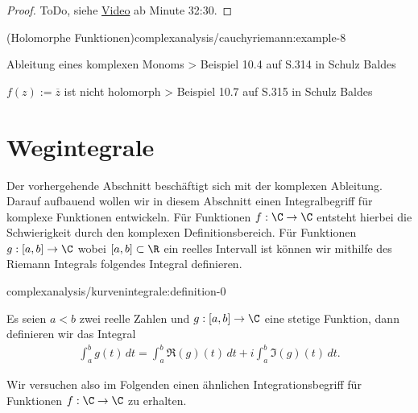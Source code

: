 \documentclass[letterpaper,10pt,german]{jupyterBook}
\begin{document}
\begin{proof}
 ToDo, siehe \href{https://www.fau.tv/clip/id/40944}{Video} ab Minute 32:30.
\end{proof}
\begin{example}{(Holomorphe Funktionen)}{complexanalysis/cauchyriemann:example-8}



\par
Ableitung eines komplexen Monoms  > Beispiel 10.4 auf S.314 in Schulz Baldes

\par
\(f(z) := \overline{z}\) ist nicht holomorph  > Beispiel 10.7 auf S.315 in Schulz Baldes
\end{example}


\section{Wegintegrale}
\label{\detokenize{complexanalysis/kurvenintegrale:wegintegrale}}\label{\detokenize{complexanalysis/kurvenintegrale::doc}}
\par
Der vorhergehende Abschnitt beschäftigt sich mit der komplexen Ableitung. Darauf aufbauend wollen wir in diesem Abschnitt einen Integralbegriff für komplexe Funktionen entwickeln. Für Funktionen \(f:\C\to\C\) entsteht hierbei die Schwierigkeit durch den komplexen Definitionsbereich. Für Funktionen \(g:[a,b]\to\C\) wobei \([a,b]\subset\R\) ein reelles Intervall ist können wir mithilfe des Riemann Integrals folgendes Integral definieren.
\begin{definition}{}{complexanalysis/kurvenintegrale:definition-0}



\par
Es seien \(a<b\) zwei reelle Zahlen und \(g:[a,b]\to\C\) eine stetige Funktion, dann definieren wir das Integral
\begin{align*}
\int_a^b g(t)\, dt = \int_a^b \Re(g)(t)\,dt + i\int_a^b \Im(g)(t)\, dt.
\end{align*}\end{definition}

\par
Wir versuchen also im Folgenden einen ähnlichen Integrationsbegriff für Funktionen \(f:\C\to\C\) zu erhalten.
\end{document}
